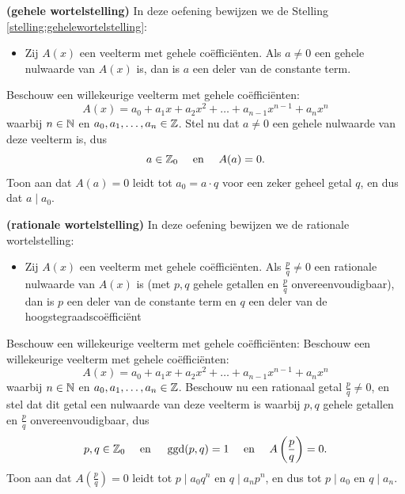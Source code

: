 \documentclass{ximera}
\begin{document}
\begin{Uitbreiding}
\begin{Oefening}\label{oefening:gehelewortelstelling}
{\bf (gehele wortelstelling)} 
In deze oefening bewijzen we de Stelling \ref{stelling:gehelewortelstelling}: 
\begin{itemize}
\item[]
Zij $A(x)$ een veelterm met gehele co\"effici\"enten. Als $a \neq 0$ een gehele nulwaarde van $A(x)$ is, dan is $a$ een deler van de constante term.
\end{itemize}
Beschouw een willekeurige veelterm met gehele co\"effici\"enten:
\[
A(x) = a_0 + a_1 x + a_2 x^2 + \dots + a_{n-1} x^{n-1} + a_nx^n
\]
waarbij $ n \in \mathbb{N}$ en $a_0, a_1, \ldots, a_n \in \mathbb{Z}$. Stel nu dat $a \neq 0$ een gehele nulwaarde van deze veelterm is, dus
\[
a \in \mathbb{Z}_0 \quad \text{ en } \quad A(a) = 0.
\]
Toon aan dat $A(a) = 0$ leidt tot $a_0 = a\cdot q$ voor een zeker geheel getal $q$, en dus dat $a \mid a_0$. 
\end{Oefening}
\end{Uitbreiding}

\clearpage

\begin{Uitbreiding}
\begin{Oefening}\label{oefening:rationalewortelstelling}
{\bf (rationale wortelstelling)} 
In deze oefening bewijzen we de rationale wortelstelling:
\begin{itemize}
\item[]
Zij $A(x)$ een veelterm met gehele co\"effici\"enten. Als $\frac{p}{q} \neq 0$ een rationale nulwaarde van $A(x)$ is (met $p,q$ gehele getallen en $\frac{p}{q}$ onvereenvoudigbaar), dan is $p$ een deler van de constante term en $q$ een deler van de hoogstegraadsco\"effici\"ent  
\end{itemize}
Beschouw een willekeurige veelterm met gehele co\"effici\"enten:
Beschouw een willekeurige veelterm met gehele co\"effici\"enten:
\[
A(x) = a_0 + a_1 x + a_2 x^2 + \dots + a_{n-1} x^{n-1} + a_nx^n
\]
waarbij $ n \in \mathbb{N}$ en $a_0, a_1, \ldots, a_n \in \mathbb{Z}$. Beschouw nu een rationaal getal $\frac{p}{q} \neq 0$, en stel dat dit getal een nulwaarde van deze veelterm is waarbij $p,q$ gehele getallen en $\frac{p}{q}$ onvereenvoudigbaar, dus
\[
p,q \in \mathbb{Z}_0 \quad \text{ en } \quad \operatorname{ggd}(p,q)=1 \quad \text{ en } \quad A\left(\frac{p}{q}\right) = 0.
\]
Toon aan dat $A\left(\frac{p}{q}\right) = 0$ leidt tot $p \mid a_0q^n$ en $q \mid a_n p^n$, en dus tot $p \mid a_0$ en $q \mid a_n$.
\end{Oefening}
\end{Uitbreiding}
\end{document}
